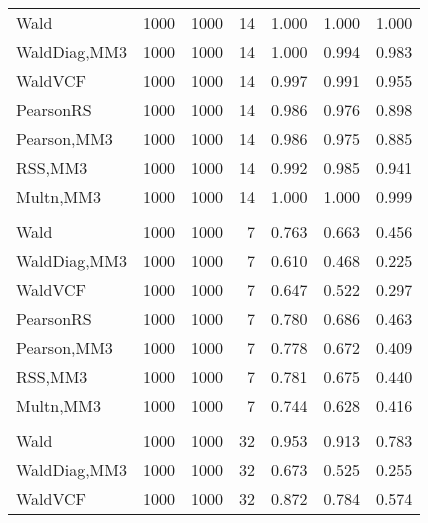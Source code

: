 \documentclass[
]{article}
\begin{document}
\begin{table}[H]
{\begin{tabular}[t]{lrrrrrr}
\hspace{1em}Wald & 1000 & 1000 & 14 & 1.000 & 1.000 & 1.000\\
\hspace{1em}WaldDiag,MM3 & 1000 & 1000 & 14 & 1.000 & 0.994 & 0.983\\
\hspace{1em}WaldVCF & 1000 & 1000 & 14 & 0.997 & 0.991 & 0.955\\
\hspace{1em}PearsonRS & 1000 & 1000 & 14 & 0.986 & 0.976 & 0.898\\
\hspace{1em}Pearson,MM3 & 1000 & 1000 & 14 & 0.986 & 0.975 & 0.885\\
\hspace{1em}RSS,MM3 & 1000 & 1000 & 14 & 0.992 & 0.985 & 0.941\\
\hspace{1em}Multn,MM3 & 1000 & 1000 & 14 & 1.000 & 1.000 & 0.999\\
\addlinespace[0.3em]
\multicolumn{7}{l}{\textbf{2F 10V}}\\
\hspace{1em}Wald & 1000 & 1000 & 7 & 0.763 & 0.663 & 0.456\\
\hspace{1em}WaldDiag,MM3 & 1000 & 1000 & 7 & 0.610 & 0.468 & 0.225\\
\hspace{1em}WaldVCF & 1000 & 1000 & 7 & 0.647 & 0.522 & 0.297\\
\hspace{1em}PearsonRS & 1000 & 1000 & 7 & 0.780 & 0.686 & 0.463\\
\hspace{1em}Pearson,MM3 & 1000 & 1000 & 7 & 0.778 & 0.672 & 0.409\\
\hspace{1em}RSS,MM3 & 1000 & 1000 & 7 & 0.781 & 0.675 & 0.440\\
\hspace{1em}Multn,MM3 & 1000 & 1000 & 7 & 0.744 & 0.628 & 0.416\\
\addlinespace[0.3em]
\multicolumn{7}{l}{\textbf{3F 15V}}\\
\hspace{1em}Wald & 1000 & 1000 & 32 & 0.953 & 0.913 & 0.783\\
\hspace{1em}WaldDiag,MM3 & 1000 & 1000 & 32 & 0.673 & 0.525 & 0.255\\
\hspace{1em}WaldVCF & 1000 & 1000 & 32 & 0.872 & 0.784 & 0.574\\

\end{tabular}}
\end{table}
\end{document}
